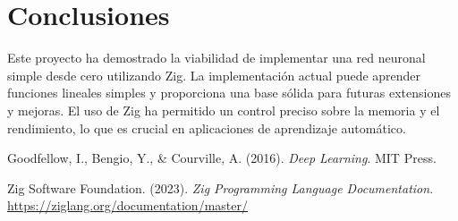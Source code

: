 \documentclass[twocolumn]{article}
\begin{document}
\section{Conclusiones}
Este proyecto ha demostrado la viabilidad de implementar una red neuronal simple desde cero utilizando Zig. La implementación actual puede aprender funciones lineales simples y proporciona una base sólida para futuras extensiones y mejoras. El uso de Zig ha permitido un control preciso sobre la memoria y el rendimiento, lo que es crucial en aplicaciones de aprendizaje automático.

\begin{thebibliography}{9}
Goodfellow, I., Bengio, Y., \& Courville, A. (2016). 
\textit{Deep Learning}. 
MIT Press.

Zig Software Foundation. (2023).
\textit{Zig Programming Language Documentation}.
\url{https://ziglang.org/documentation/master/}
\end{thebibliography}
\end{document}
